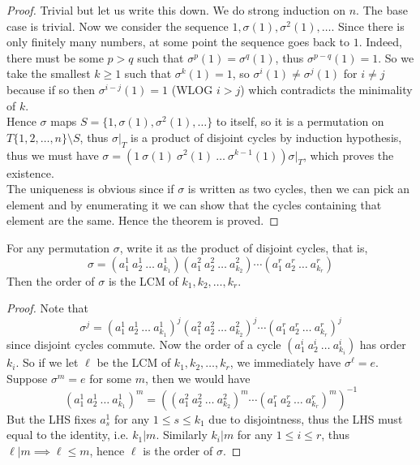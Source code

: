 \begin{proof}
    Trivial but let us write this down.
    We do strong induction on $n$.
    The base case is trivial.
    Now we consider the sequence $1, \sigma(1),\sigma^2(1),\ldots$.
    Since there is only finitely many numbers, at some point the sequence goes back to $1$.
    Indeed, there must be some $p>q$ such that $\sigma^p(1)=\sigma^q(1)$, thus $\sigma^{p-q}(1)=1$.
    So we take the smallest $k\ge 1$ such that $\sigma^k(1)=1$, so $\sigma^i(1)\neq\sigma^j(1)$ for $i\neq j$ because if so then $\sigma^{i-j}(1)=1$ (WLOG $i>j$) which contradicts the minimality of $k$.\\
    Hence $\sigma$ maps $S=\{1,\sigma(1),\sigma^2(1),\ldots\}$ to itself, so it is a permutation on $T\{1,2,\ldots,n\}\setminus S$, thus $\sigma|_T$ is a product of disjoint cycles by induction hypothesis, thus we must have $\sigma=(1\ \sigma(1)\ \sigma^2(1)\ \ldots\ \sigma^{k-1}(1))\sigma|_T$, which proves the existence.\\
    The uniqueness is obvious since if $\sigma$ is written as two cycles, then we can pick an element and by enumerating it we can show that the cycles containing that element are the same.
    Hence the theorem is proved.
\end{proof}
\begin{lemma}
    For any permutation $\sigma$, write it as the product of disjoint cycles, that is,
    $$\sigma=(a_1^1\ a_2^1\ \ldots\ a_{k_1}^1)(a_1^2\ a_2^2\ \ldots\ a_{k_2}^2)\cdots (a_1^r\ a_2^r\ \ldots\ a_{k_r}^r)$$
    Then the order of $\sigma$ is the LCM of $k_1,k_2,\ldots,k_r$.
\end{lemma}
\begin{proof}
    Note that
    $$\sigma^j=(a_1^1\ a_2^1\ \ldots\ a_{k_1}^1)^j(a_1^2\ a_2^2\ \ldots\ a_{k_2}^2)^j\cdots (a_1^r\ a_2^r\ \ldots\ a_{k_r}^r)^j$$
    since disjoint cycles commute.
    Now the order of a cycle $(a_1^i\ a_2^i\ \ldots\ a_{k_i}^i)$ has order $k_i$.
    So if we let $\ell$ be the LCM of $k_1,k_2,\ldots,k_r$, we immediately have $\sigma^\ell=e$.
    Suppose $\sigma^m=e$ for some $m$, then we would have
    $$(a_1^1\ a_2^1\ \ldots\ a_{k_1}^1)^m=((a_1^2\ a_2^2\ \ldots\ a_{k_2}^2)^m\cdots (a_1^r\ a_2^r\ \ldots\ a_{k_r}^r)^m)^{-1}$$
    But the LHS fixes $a_s^1$ for any $1\le s\le k_1$ due to disjointness, thus the LHS must equal to the identity, i.e. $k_1|m$.
    Similarly $k_i|m$ for any $1\le i\le r$, thus $\ell|m\implies \ell\le m$, hence $\ell$ is the order of $\sigma$.
\end{proof}
